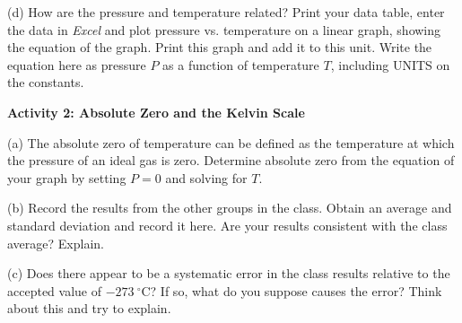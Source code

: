 (d) How are the pressure and temperature related?  Print your data table, enter the data in \textit{Excel} and plot pressure vs. temperature on a linear graph, showing the equation of the graph.  Print this graph and add it to this unit. Write the equation here as pressure $P$ as a function of temperature $T$, including UNITS on the constants.
\vspace{15mm}



\textbf{Activity 2: Absolute Zero and the Kelvin Scale}

(a) The absolute zero of temperature can be defined as the temperature
at which the pressure of an ideal gas is zero. Determine absolute
zero from the equation of your graph by setting $P = 0$ and solving for $T$.
\vspace{25mm}

(b) Record the results from the other groups in the class. 
Obtain an average and standard deviation and record it here.
Are your results consistent with the class average?  Explain.
\vspace{25mm}

(c) Does there appear to be a systematic error in the class results relative 
to the accepted value of $-273~^{\circ}$C?  If so, what do you suppose 
causes the error? Think about this and try to explain.



